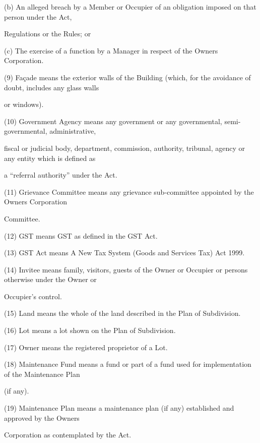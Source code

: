\documentclass{article}
\begin{document}
{\fontsize{9.962}{1}(b) An alleged breach by a Member or Occupier of an obligation imposed on that person under the Act, }

{\fontsize{10.02}{1}Regulations or the Rules; or }

{\fontsize{9.962}{1}(c) The exercise of a function by a Manager in respect of the Owners Corporation. }

{\fontsize{9.962}{1}(9) Façade means the exterior walls of the Building (which, for the avoidance of doubt, includes any glass walls }

{\fontsize{10.02}{1}or windows). }

{\fontsize{9.962}{1}(10) Government Agency means any government or any governmental, semi-governmental, administrative, }

{\fontsize{10.02}{1}fiscal or judicial body, department, commission, authority, tribunal, agency or any entity which is defined as }

{\fontsize{10.02}{1}a “referral authority” under the Act. }

{\fontsize{9.962}{1}(11) Grievance Committee means any grievance sub-committee appointed by the Owners Corporation }

{\fontsize{10.02}{1}Committee. }

{\fontsize{9.962}{1}(12) GST means GST as defined in the GST Act. }

{\fontsize{9.962}{1}(13) GST Act means A New Tax System (Goods and Services Tax) Act 1999. }

{\fontsize{9.962}{1}(14) Invitee means family, visitors, guests of the Owner or Occupier or persons otherwise under the Owner or }

{\fontsize{10.02}{1}Occupier’s control. }

{\fontsize{9.962}{1}(15) Land means the whole of the land described in the Plan of Subdivision. }

{\fontsize{9.962}{1}(16) Lot means a lot shown on the Plan of Subdivision. }

{\fontsize{9.962}{1}(17) Owner means the registered proprietor of a Lot. }

{\fontsize{9.962}{1}(18) Maintenance Fund means a fund or part of a fund used for implementation of the Maintenance Plan }

{\fontsize{10.02}{1}(if any).  }

{\fontsize{9.962}{1}(19) Maintenance Plan means a maintenance plan (if any) established and approved by the Owners }

{\fontsize{10.02}{1}Corporation as contemplated by the Act.  }
\end{document}
